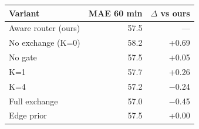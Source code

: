 \begin{tabular}{lrr}
\toprule
Variant & MAE 60 min & $\Delta$ vs ours \\
\midrule
Aware router (ours) & 57.5 & --- \\
\midrule
No exchange (K=0) & 58.2 & +0.69 \\
No gate & 57.5 & +0.05 \\
K=1 & 57.7 & +0.26 \\
K=4 & 57.2 & $-$0.24 \\
Full exchange & 57.0 & $-$0.45 \\
Edge prior & 57.5 & +0.00 \\
\bottomrule
\end{tabular}
